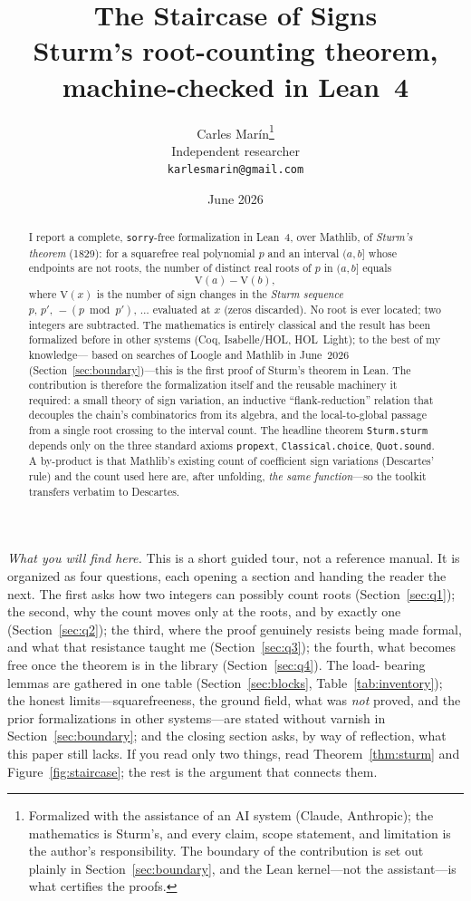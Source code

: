 \documentclass[11pt]{article}
\title{\bf The Staircase of Signs\\[4pt]
  \large\normalfont Sturm's root-counting theorem, machine-checked in Lean~4}
\author{Carles Mar\'in\thanks{Formalized with the assistance of an AI system (Claude,
Anthropic); the mathematics is Sturm's, and every claim, scope statement, and limitation is
the author's responsibility. The boundary of the contribution is set out plainly in
Section~\ref{sec:boundary}, and the Lean kernel---not the assistant---is what certifies the
proofs.}\\[3pt]
  \normalsize Independent researcher\\
  \normalsize \texttt{karlesmarin@gmail.com}}
\date{June 2026}
\newcommand{\lean}[1]{\texttt{#1}}
\newcommand{\V}{\mathrm{V}}
\begin{document}
\maketitle

\begin{abstract}
I report a complete, \lean{sorry}-free formalization in Lean~4, over Mathlib, of \emph{Sturm's
theorem} (1829): for a squarefree real polynomial $p$ and an interval $(a,b]$ whose endpoints
are not roots, the number of distinct real roots of $p$ in $(a,b]$ equals
\[
  \V(a)-\V(b),
\]
where $\V(x)$ is the number of sign changes in the \emph{Sturm sequence}
$p,\,p',\,-(p \bmod p'),\,\dots$ evaluated at $x$ (zeros discarded). No root is ever located;
two integers are subtracted. The mathematics is entirely classical and the result has been
formalized before in other systems (Coq, Isabelle/HOL, HOL~Light); to the best of my knowledge---
based on searches of Loogle and Mathlib in June~2026 (Section~\ref{sec:boundary})---this is the
first proof of Sturm's theorem in Lean. The contribution is therefore the
formalization itself and the reusable machinery it required: a small theory of sign variation,
an inductive ``flank-reduction'' relation that decouples the chain's combinatorics from its
algebra, and the local-to-global passage from a single root crossing to the interval count. The
headline theorem \lean{Sturm.sturm} depends only on the three standard axioms \lean{propext},
\lean{Classical.choice}, \lean{Quot.sound}. A by-product is that Mathlib's existing count of
coefficient sign variations (Descartes' rule) and the count used here are, after unfolding,
\emph{the same function}---so the toolkit transfers verbatim to Descartes.
\end{abstract}

\medskip
\noindent\emph{What you will find here.} This is a short guided tour, not a reference manual. It
is organized as four questions, each opening a section and handing the reader the next. The first
asks how two integers can possibly count roots (Section~\ref{sec:q1}); the second, why the count
moves only at the roots, and by exactly one (Section~\ref{sec:q2}); the third, where the proof
genuinely resists being made formal, and what that resistance taught me (Section~\ref{sec:q3});
the fourth, what becomes free once the theorem is in the library (Section~\ref{sec:q4}). The load-
bearing lemmas are gathered in one table (Section~\ref{sec:blocks}, Table~\ref{tab:inventory});
the honest limits---squarefreeness, the ground field, what was \emph{not} proved, and the prior
formalizations in other systems---are stated without varnish in Section~\ref{sec:boundary}; and
the closing section asks, by way of reflection, what this paper still lacks. If you read only two
things, read Theorem~\ref{thm:sturm} and Figure~\ref{fig:staircase}; the rest is the argument that
connects them.
\end{document}
